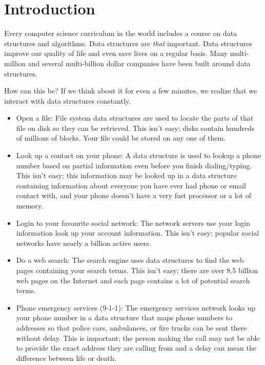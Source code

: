 \chapter{Introduction}

Every computer science curriculum in the world includes a course on data
structures and algorithms.  Data structures are \emph{that} important.
Data structures improve our quality of life and even save lives on a
regular basis.  Many multi-million and several multi-billion dollar
companies have been built around data structures.

How can this be?  If we think about it for even a few minutes, we
realize that we interact with data structures constantly.
\begin{itemize}
  \item  Open a file: File system data structures are used to locate
    the parts of that file on disk so they can be retrieved.  This isn't
    easy; disks contain hundreds of millions of blocks.  Your file could
    be stored on any one of them.
  \item Look up a contact on your phone:  A data
    structure is used to lookup a phone number based on partial
    information even before you finish dialing/typing.  This isn't easy;
    this information may be looked up in a data structure containing
    information about everyone you have ever had phone or email contact
    with, and your phone doesn't have a very fast processor or a lot
    of memory.
  \item Login to your favourite social network:  The network servers
    use your login information look up your account information.
    This isn't easy; popular social networks have nearly a billion
    active users.
  \item Do a web search: The search engine uses data structures to find
    the web pages containing your search terms.  This isn't easy; there
    are over 8.5 billion web pages on the Internet and each page contains
    a lot of potential search terms.
  \item Phone emergency services (9-1-1):  The emergency services network
    looks up your phone number in a data structure that maps phone numbers
    to addresses so that police cars, ambulances, or fire trucks can be
    sent there without delay. This is important;  the person making the
    call may not be able to provide the exact address they are calling
    from and a delay can mean the difference between life or death.
\end{itemize}

